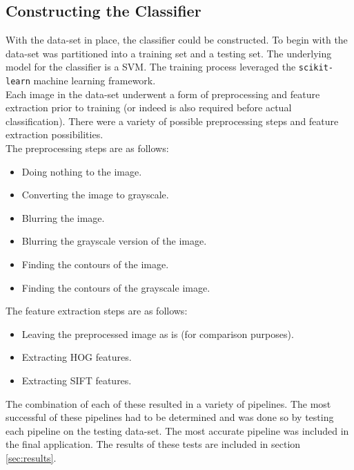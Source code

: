 \documentclass[letterpaper, 10 pt, conference]{conf/ieeeconf}  %
\begin{document}
\subsection{Constructing the Classifier} %
With the data-set in place, the classifier could be constructed. To begin with
the data-set was partitioned into a training set and a testing set. The
underlying model for the classifier is a SVM. The training process leveraged the
\texttt{scikit-learn} machine learning framework.\\

Each image in the data-set underwent a form of preprocessing and feature
extraction prior to training (or indeed is also required before actual
classification). There were a variety of possible preprocessing steps and
feature extraction possibilities.\\

The preprocessing steps are as follows:
\begin{itemize}
\item Doing nothing to the image.
\item Converting the image to grayscale.
\item Blurring the image.
\item Blurring the grayscale version of the image.
\item Finding the contours of the image.
\item Finding the contours of the grayscale image.
\end{itemize}

The feature extraction steps are as follows:
\begin{itemize}
\item Leaving the preprocessed image as is (for comparison purposes).
\item Extracting HOG features.
\item Extracting SIFT features.
\end{itemize}

The combination of each of these resulted in a variety of pipelines. The most
successful of these pipelines had to be determined and was done so by testing
each pipeline on the testing data-set. The most accurate pipeline was included
in the final application. The results of these tests are included in section
\ref{sec:results}.\\
\end{document}
